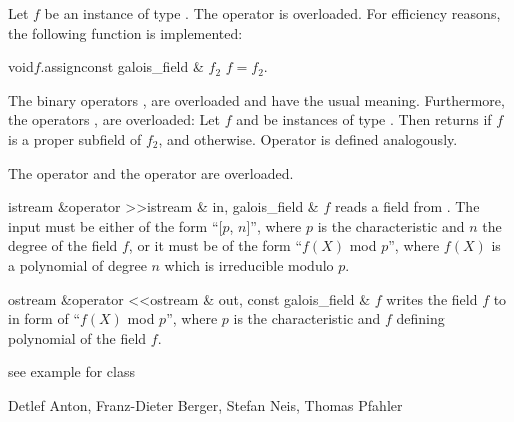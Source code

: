 \ASGN

Let $f$ be an instance of type .  The operator \code{=} is overloaded.  For
efficiency reasons, the following function is implemented:

\begin{fcode}{void}{$f$.assign}{const galois_field & $f_2$}
  $f = f_2$.
\end{fcode}



\COMP

The binary operators \code{==}, \code{!=} are overloaded and have the usual meaning.
Furthermore, the operators \code{<}, \code{>} are overloaded: Let $f$ and  be instances
of type .  Then  returns \TRUE if $f$ is a proper subfield
of $f_2$, and \FALSE otherwise.  Operator \code{>} is defined analogously.



\IO

The  operator \code{>>} and the  operator \code{<<} are overloaded.

\begin{fcode}{istream &}{operator >>}{istream & in, galois_field & $f$}
  reads a field from  .  The input must be either of the form ``[$p$,
  $n$]'', where $p$ is the characteristic and $n$ the degree of the field $f$, or it must be of
  the form ``$f(X)$ mod $p$'', where $f(X)$ is a polynomial of degree $n$ which is irreducible
  modulo $p$.
\end{fcode}

\begin{fcode}{ostream &}{operator <<}{ostream & out, const galois_field & $f$}
  writes the field $f$ to   in form of ``$f(X)$ mod $p$'', where $p$ is
  the characteristic and $f$ defining polynomial of the field $f$.
\end{fcode}



\SEEALSO




\EXAMPLES

see example for class 



\AUTHOR

Detlef Anton, Franz-Dieter Berger, Stefan Neis, Thomas Pfahler
